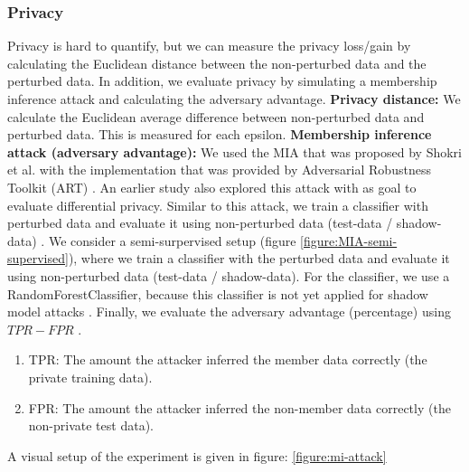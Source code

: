 \subsubsection{Privacy}
Privacy is hard to quantify, but we can measure the privacy loss/gain by calculating the Euclidean distance between the non-perturbed data and the perturbed data.
In addition, we evaluate privacy by simulating a membership inference attack and calculating the adversary advantage. \newline
\textbf{Privacy distance:} We calculate the Euclidean average difference between non-perturbed data and perturbed data.
This is measured for each epsilon. \newline
\textbf{Membership inference attack (adversary advantage):}
%
We used the MIA that was proposed by Shokri et al. with the implementation that was provided by Adversarial Robustness Toolkit (ART) \citep{noauthor_adversarial_2023}.
An earlier study also explored this attack with as goal to evaluate differential privacy.
Similar to this attack, we train a classifier with perturbed data and evaluate it using non-perturbed data (test-data / shadow-data) \citep{zhao_not_2020}.
We consider a semi-surpervised setup (figure \ref{figure:MIA-semi-supervised}), where we train a classifier with the perturbed data and evaluate it using non-perturbed data (test-data / shadow-data).
For the classifier, we use a RandomForestClassifier, because this classifier is not yet applied for shadow model attacks \citep{rigaki_survey_2021}.
Finally, we evaluate the adversary advantage (percentage) using $TPR - FPR$ \citep{yeom_privacy_2018}.
\begin{enumerate}
  \item TPR: The amount the attacker inferred the member data correctly (the private training data).
  \item FPR: The amount the attacker inferred the non-member data correctly (the non-private test data).
\end{enumerate}
A visual setup of the experiment is given in figure: \ref{figure:mi-attack}

